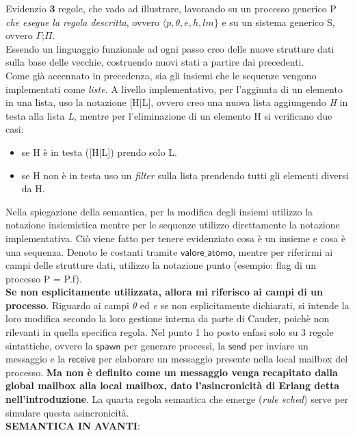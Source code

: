 \documentclass[background.tex]{subfiles}
\begin{document}
Evidenzio \textbf{3} regole, che vado ad illustrare, lavorando su un processo generico P \textit{che esegue la regola descritta}, ovvero $\displaystyle \langle p,\theta,e,h,lm\}$ e su un sistema generico S, ovvero $\Gamma$;$\Pi$.\\
Essendo un linguaggio funzionale ad ogni passo creo delle nuove strutture dati sulla base delle vecchie, costruendo nuovi stati a partire dai precedenti.\\
Come già accennato in precedenza, sia gli insiemi che le sequenze vengono implementati come \textit{liste}. A livello implementativo, per l'aggiunta di un elemento in una lista, uso la notazione [H$\mid$L], ovvero creo una nuova lista aggiungendo \textit{H} in testa alla lista \textit{L}, mentre per l'eliminazione di un elemento H si verificano due casi:
	\begin{itemize}
		\item se H è in testa ([H$\mid$L]) prendo solo L.
		\item se H non è in testa uso un \textit{filter} sulla lista prendendo tutti gli elementi diversi da H.
	\end{itemize}
Nella spiegazione della semantica, per la modifica degli insiemi utilizzo la notazione insiemistica mentre per le sequenze utilizzo direttamente la notazione implementativa.
Ciò viene fatto per tenere evidenziato cosa è un insieme e cosa è una sequenza.
Denoto le costanti tramite $\mathsf{valore\_atomo}$, mentre per riferirmi ai campi delle strutture dati, utilizzo la notazione punto (esempio: flag di un processo P = P.f).\\
\textbf{Se non esplicitamente utilizzata, allora mi riferisco ai campi di un processo}.
Riguardo ai campi $\theta$ ed \textit{e} se non esplicitamente dichiarati, si intende la loro modifica secondo la loro gestione interna da parte di Cauder, poichè non rilevanti in quella specifica regola.
Nel punto 1 ho posto enfasi solo su 3 regole sintattiche, ovvero la $\mathsf{spawn}$ per generare processi, la $\mathsf{send}$ per inviare un messaggio e la $\mathsf{receive}$ per elaborare un messaggio presente nella local mailbox del processo.
\textbf{Ma non è definito come un messaggio venga recapitato dalla global mailbox alla local mailbox, dato l'asincronicità di Erlang detta nell'introduzione}. La quarta regola semantica che emerge (\textit{rule sched}) serve per simulare questa asincronicità.\\
\textbf{SEMANTICA IN AVANTI}:
\end{document}
